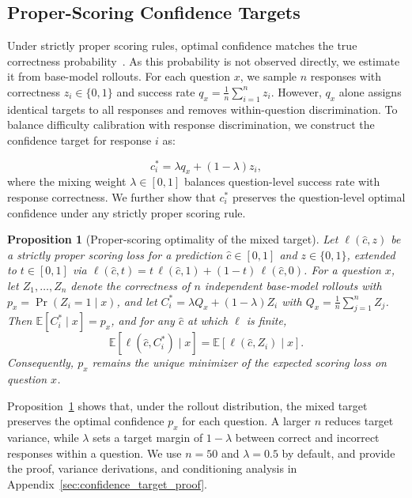 \documentclass{article} %
\newtheorem{proposition}{Proposition}
\begin{document}
\subsection{Proper-Scoring Confidence Targets}
Under strictly proper scoring rules, optimal confidence matches the true correctness probability~\citep{gneiting2007strictly}.
As this probability is not observed directly, we estimate it from base-model rollouts.
For each question $x$, we sample $n$ responses with correctness $z_i \in \{0, 1\}$ and success rate $q_x = \frac{1}{n} \sum_{i=1}^n z_i$.
However, $q_x$ alone assigns identical targets to all responses and removes within-question discrimination.
To balance difficulty calibration with response discrimination, we construct the confidence target for response $i$ as:

\begin{equation}
    \label{eq:calibsft_target}
    c_i^* = \lambda q_x + (1 - \lambda) z_i,
\end{equation}
where the mixing weight $\lambda\in[0,1]$ balances question-level success rate with response correctness.
We further show that $c_i^*$ preserves the question-level optimal confidence under any strictly proper scoring rule.

\begin{proposition}[Proper-scoring optimality of the mixed target]
\label{prop:confidence_target_moments}
Let $\ell(\hat c, z)$ be a strictly proper scoring loss for a prediction $\hat c \in [0, 1]$ and $z \in \{0, 1\}$, extended to $t \in [0, 1]$ via $\ell(\hat c, t) = t \, \ell(\hat c, 1) + (1 - t) \, \ell(\hat c, 0)$.
For a question $x$, let $Z_1, \ldots, Z_n$ denote the correctness of $n$ independent base-model rollouts with $p_x = \Pr(Z_i = 1 \mid x)$, and let $C_i^* = \lambda Q_x + (1 - \lambda) Z_i$ with $Q_x = \frac{1}{n} \sum_{j=1}^n Z_j$.
Then $\mathbb E[C_i^* \mid x] = p_x$, and for any $\hat c$ at which $\ell$ is finite,
\begin{equation}
    \label{eq:proper_scoring_equivalence}
    \mathbb E[\ell(\hat c, C_i^*) \mid x] = \mathbb E[\ell(\hat c, Z_i) \mid x].
\end{equation}
Consequently, $p_x$ remains the unique minimizer of the expected scoring loss on question $x$.
\end{proposition}

Proposition~\ref{prop:confidence_target_moments} shows that, under the rollout distribution, the mixed target preserves the optimal confidence $p_x$ for each question.
A larger $n$ reduces target variance, while $\lambda$ sets a target margin of $1-\lambda$ between correct and incorrect responses within a question.
We use $n=50$ and $\lambda=0.5$ by default, and provide the proof, variance derivations, and conditioning analysis in Appendix~\ref{sec:confidence_target_proof}.
\end{document}

